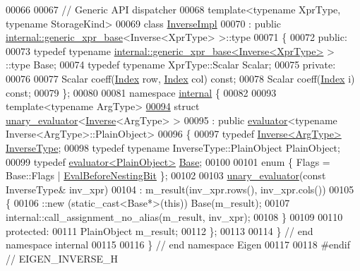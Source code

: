 \begin{DoxyCode}
00066 
00067 \textcolor{comment}{// Generic API dispatcher}
00068 \textcolor{keyword}{template}<\textcolor{keyword}{typename} XprType, \textcolor{keyword}{typename} StorageKind>
00069 \textcolor{keyword}{class }\hyperlink{class_eigen_1_1_inverse_impl}{InverseImpl}
00070   : \textcolor{keyword}{public} \hyperlink{struct_eigen_1_1internal_1_1generic__xpr__base}{internal::generic\_xpr\_base}<Inverse<XprType> >::type
00071 \{
00072 \textcolor{keyword}{public}:
00073   \textcolor{keyword}{typedef} \textcolor{keyword}{typename} \hyperlink{struct_eigen_1_1internal_1_1generic__xpr__base}{internal::generic\_xpr\_base<Inverse<XprType>} >
      ::type Base;
00074   \textcolor{keyword}{typedef} \textcolor{keyword}{typename} XprType::Scalar Scalar;
00075 \textcolor{keyword}{private}:
00076 
00077   Scalar coeff(\hyperlink{namespace_eigen_a62e77e0933482dafde8fe197d9a2cfde}{Index} row, \hyperlink{namespace_eigen_a62e77e0933482dafde8fe197d9a2cfde}{Index} col) \textcolor{keyword}{const};
00078   Scalar coeff(\hyperlink{namespace_eigen_a62e77e0933482dafde8fe197d9a2cfde}{Index} i) \textcolor{keyword}{const};
00079 \};
00080 
00081 \textcolor{keyword}{namespace }\hyperlink{namespaceinternal}{internal} \{
00082 
00093 \textcolor{keyword}{template}<\textcolor{keyword}{typename} ArgType>
\hyperlink{struct_eigen_1_1internal_1_1unary__evaluator_3_01_inverse_3_01_arg_type_01_4_01_4}{00094} \textcolor{keyword}{struct }\hyperlink{struct_eigen_1_1internal_1_1unary__evaluator}{unary\_evaluator}<\hyperlink{class_eigen_1_1_inverse}{Inverse}<ArgType> >
00095   : \textcolor{keyword}{public} \hyperlink{struct_eigen_1_1internal_1_1evaluator}{evaluator}<typename Inverse<ArgType>::PlainObject>
00096 \{
00097   \textcolor{keyword}{typedef} \hyperlink{class_eigen_1_1_inverse}{Inverse<ArgType>} \hyperlink{class_eigen_1_1_inverse}{InverseType};
00098   \textcolor{keyword}{typedef} \textcolor{keyword}{typename} InverseType::PlainObject PlainObject;
00099   \textcolor{keyword}{typedef} \hyperlink{struct_eigen_1_1internal_1_1evaluator}{evaluator<PlainObject>} \hyperlink{struct_eigen_1_1internal_1_1evaluator}{Base};
00100   
00101   \textcolor{keyword}{enum} \{ Flags = Base::Flags | \hyperlink{group__flags_gaa34e83bae46a8eeae4e69ebe3aaecbed}{EvalBeforeNestingBit} \};
00102 
00103   \hyperlink{struct_eigen_1_1internal_1_1unary__evaluator}{unary\_evaluator}(\textcolor{keyword}{const} InverseType& inv\_xpr)
00104     : m\_result(inv\_xpr.rows(), inv\_xpr.cols())
00105   \{
00106     ::new (static\_cast<Base*>(\textcolor{keyword}{this})) Base(m\_result);
00107     internal::call\_assignment\_no\_alias(m\_result, inv\_xpr);
00108   \}
00109   
00110 \textcolor{keyword}{protected}:
00111   PlainObject m\_result;
00112 \};
00113   
00114 \} \textcolor{comment}{// end namespace internal}
00115 
00116 \} \textcolor{comment}{// end namespace Eigen}
00117 
00118 \textcolor{preprocessor}{#endif // EIGEN\_INVERSE\_H}
\end{DoxyCode}
